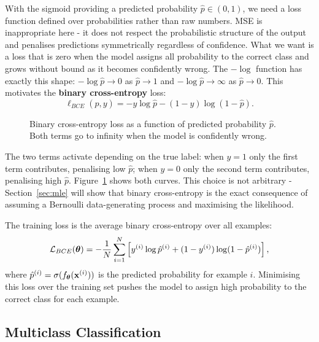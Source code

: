 With the sigmoid providing a predicted probability $\hat{p} \in (0,1)$, we need a loss function defined over probabilities rather than raw numbers. MSE is inappropriate here - it does not respect the probabilistic structure of the output and penalises predictions symmetrically regardless of confidence. What we want is a loss that is zero when the model assigns all probability to the correct class and grows without bound as it becomes confidently wrong. The $-\log$ function has exactly this shape: $-\log \hat{p} \to 0$ as $\hat{p} \to 1$ and $-\log \hat{p} \to \infty$ as $\hat{p} \to 0$. This motivates the \textbf{binary cross-entropy} loss:
\begin{equation}
    \ell_{BCE}(\hat{p}, y) = -y \log \hat{p} - (1-y) \log(1-\hat{p}).
\end{equation}

\begin{figure}
\centering
{}
\resizebox{0.36\textwidth}{!}{}
\caption{Binary cross-entropy loss as a function of predicted probability $\hat{p}$. Both terms go to infinity when the model is confidently wrong.}
\label{fig:bce}
\end{figure}

The two terms activate depending on the true label: when $y=1$ only the first term contributes, penalising low $\hat{p}$; when $y=0$ only the second term contributes, penalising high $\hat{p}$. Figure~\ref{fig:bce} shows both curves. This choice is not arbitrary - Section~\ref{sec:mle} will show that binary cross-entropy is the exact consequence of assuming a Bernoulli data-generating process and maximising the likelihood.

The training loss is the average binary cross-entropy over all examples:
\begin{equation}
    \mathcal{L}_{BCE}(\boldsymbol{\theta}) = -\frac{1}{N} \sum_{i=1}^{N} \left[ y^{(i)} \log \hat{p}^{(i)} + (1-y^{(i)}) \log(1-\hat{p}^{(i)}) \right],
\end{equation}
where $\hat{p}^{(i)} = \sigma(f_{\boldsymbol{\theta}}(\mathbf{x}^{(i)}))$ is the predicted probability for example $i$. Minimising this loss over the training set pushes the model to assign high probability to the correct class for each example.


\subsection{Multiclass Classification}\label{sec:ce}

